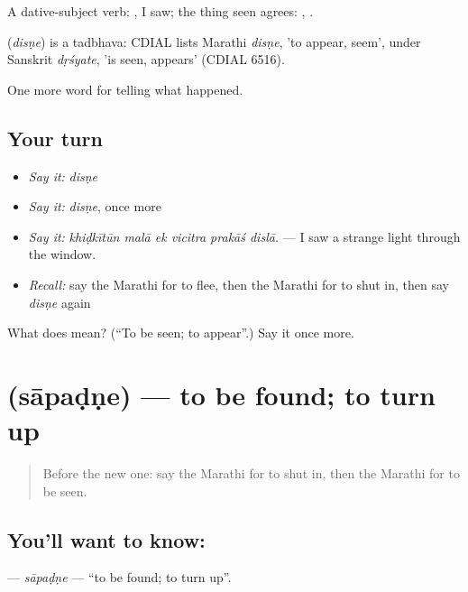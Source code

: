 A dative-subject verb:  , I saw; the thing seen agrees:   ,   .

\begin{cousinweb}
\textbf{} (\emph{disṇe}) is a tadbhava: CDIAL lists Marathi \emph{disṇe}, 'to appear, seem', under Sanskrit \emph{dṛśyate}, 'is seen, appears' (CDIAL 6516).
\end{cousinweb}

\begin{grammarlens}[title={What you've built}]
One more word for telling what happened.
\end{grammarlens}

\subsection*{Your turn}
\begin{itemize}
\raggedright
  \item \emph{Say it:} \emph{disṇe}
  \item \emph{Say it:} \emph{disṇe}, once more
  \item \emph{Say it:} \emph{khiḍkītūn malā ek vicitra prakāś dislā.} — I saw a strange light through the window.
  \item \emph{Recall:} say the Marathi for to flee, then the Marathi for to shut in, then say \emph{disṇe} again
\end{itemize}

\begin{tcolorbox}[breakable,colback=teal!4,colframe=teal!35!black,title={Before you move on}]
What does  mean? (\textquotedblleft{}To be seen; to appear\textquotedblright{}.) Say it once more.
\end{tcolorbox}
\section[\texorpdfstring{\mr{सापडणे} (sāpaḍṇe)}{सापडणे (sāpaḍṇe)}]{ (sāpaḍṇe) — to be found; to turn up}

\label{lesson:MR-C301-sapadne}



\begin{quote}
Before the new one: say the Marathi for to shut in, then the Marathi for to be seen.
\end{quote}

\subsection*{You'll want to know: }
\textbf{} — \emph{sāpaḍṇe} — \textquotedblleft{}to be found; to turn up\textquotedblright{}.

